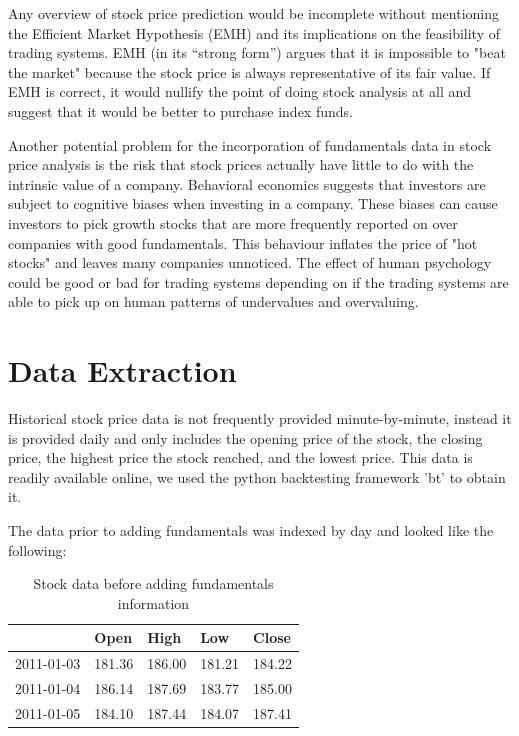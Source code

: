 \documentclass{article}
\begin{document}
Any overview of stock price prediction would be incomplete without mentioning the Efficient Market Hypothesis (EMH)\cite{malkiel_2003} and its implications on the feasibility of trading systems. EMH (in its “strong form”) argues that it is impossible to "beat the market" because the stock price is always representative of its fair value. If EMH is correct, it would nullify the point of doing stock analysis at all and suggest that it would be better to purchase index funds. 

Another potential problem for the incorporation of fundamentals data in stock price analysis is the risk that stock prices actually have little to do with the intrinsic value of a company. Behavioral economics suggests that investors are subject to  cognitive biases when investing in a company. These biases can cause investors to pick growth stocks that are more frequently reported on over companies with good fundamentals. This behaviour inflates the price of "hot stocks" and leaves many companies unnoticed. The effect of human psychology could be good or bad for trading systems depending on if the trading systems are able to pick up on human patterns of undervalues and overvaluing.

\section{Data Extraction}
\label{sec:data_extraction}

Historical stock price data is not frequently provided minute-by-minute, instead it is provided daily and only includes the opening price of the stock, the closing price, the highest price the stock reached, and the lowest price. This data is readily available online, we used the python backtesting framework 'bt' to obtain it. 

The data prior to adding fundamentals was indexed by day and looked like the following:
\begin{table}[H]
\centering
\begin{tabular}{|l|l|l|l|l|}
\hline
 & Open & High & Low & Close \\ \hline
2011-01-03 & 181.36 & 186.00 & 181.21 & 184.22\\ \hline
2011-01-04 & 186.14 & 187.69 & 183.77 & 185.00 \\ \hline
2011-01-05 & 184.10 & 187.44 & 184.07 & 187.41\\ \hline
\end{tabular}
\caption{Stock data before adding fundamentals information}
\label{my-label}
\end{table}
\end{document}
